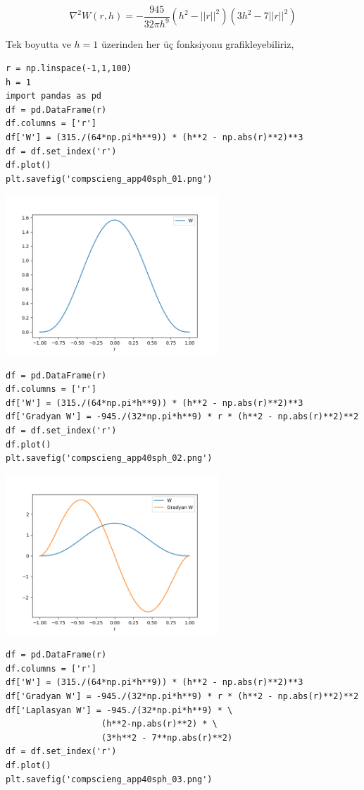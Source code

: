 \documentclass[12pt,fleqn]{article}\usepackage{../../common}
\begin{document}
$$
\nabla^2 W (r, h) =
- \frac{945}{32\pi h^9} (h^2 - ||r||^2)(3 h^2 - 7||r||^2)
$$

Tek boyutta ve $h=1$ üzerinden her üç fonksiyonu grafikleyebiliriz,

\begin{verbatim}
r = np.linspace(-1,1,100)
h = 1
import pandas as pd
df = pd.DataFrame(r)
df.columns = ['r']
df['W'] = (315./(64*np.pi*h**9)) * (h**2 - np.abs(r)**2)**3
df = df.set_index('r')
df.plot()
plt.savefig('compscieng_app40sph_01.png')
\end{verbatim}

\includegraphics[height=6cm]{compscieng_app40sph_01.png}

\begin{verbatim}
df = pd.DataFrame(r)
df.columns = ['r']
df['W'] = (315./(64*np.pi*h**9)) * (h**2 - np.abs(r)**2)**3
df['Gradyan W'] = -945./(32*np.pi*h**9) * r * (h**2 - np.abs(r)**2)**2
df = df.set_index('r')
df.plot()
plt.savefig('compscieng_app40sph_02.png')
\end{verbatim}

\includegraphics[height=6cm]{compscieng_app40sph_02.png}

\begin{verbatim}
df = pd.DataFrame(r)
df.columns = ['r']
df['W'] = (315./(64*np.pi*h**9)) * (h**2 - np.abs(r)**2)**3
df['Gradyan W'] = -945./(32*np.pi*h**9) * r * (h**2 - np.abs(r)**2)**2
df['Laplasyan W'] = -945./(32*np.pi*h**9) * \
                   (h**2-np.abs(r)**2) * \
                   (3*h**2 - 7**np.abs(r)**2)
df = df.set_index('r')
df.plot()
plt.savefig('compscieng_app40sph_03.png')
\end{verbatim}
\end{document}
